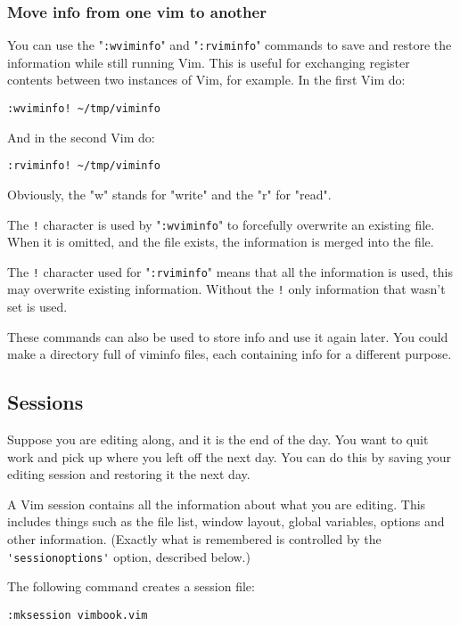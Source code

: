 \subsubsection{Move info from one vim to another}
You can use the "\verb!:wviminfo!" and "\verb!:rviminfo!" commands to save and restore the information while still running Vim.
This is useful for exchanging register contents between two instances of Vim, for example.
In the first Vim do:

\begin{Verbatim}[samepage=true]
 :wviminfo! ~/tmp/viminfo
\end{Verbatim}

And in the second Vim do:

\begin{Verbatim}[samepage=true]
 :rviminfo! ~/tmp/viminfo
\end{Verbatim}

Obviously, the "w" stands for "write" and the "r" for "read".

The \verb:!: character is used by "\verb!:wviminfo!" to forcefully overwrite an existing file.
When it is omitted, and the file exists, the information is merged into the file.

The \verb:!: character used for "\verb!:rviminfo!" means that all the information is used, this may overwrite existing information.
Without the \verb:!: only information that wasn't set is used.

These commands can also be used to store info and use it again later.
You could make a directory full of viminfo files, each containing info for a different purpose.
\subsection{Sessions}
Suppose you are editing along, and it is the end of the day.
You want to quit work and pick up where you left off the next day.
You can do this by saving your editing session and restoring it the next day.

A Vim session contains all the information about what you are editing.
This includes things such as the file list, window layout, global variables, options and other information.
(Exactly what is remembered is controlled by the \verb!'sessionoptions'! option, described below.)

The following command creates a session file:

\begin{Verbatim}[samepage=true]
 :mksession vimbook.vim
\end{Verbatim}

